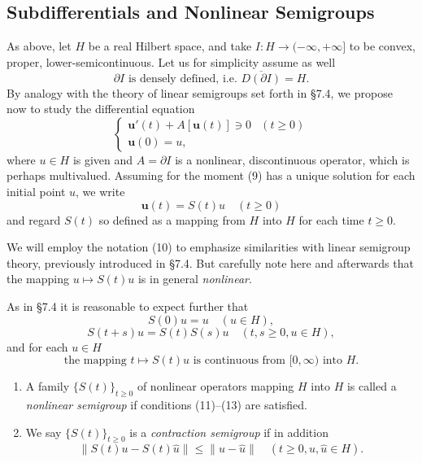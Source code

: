\subsection{Subdifferentials and Nonlinear Semigroups}
\label{sec:subdifferentials-nonlinear-semigroups}

As above, let $H$ be a real Hilbert space, and take $I : H \to (-\infty, +\infty]$ to be convex, proper, lower-semicontinuous. Let us for simplicity assume as well
\[
\partial I \text{ is densely defined, i.e. } \overline{D(\partial I)} = H.
\tag{8}
\]
By analogy with the theory of linear semigroups set forth in \S7.4, we propose now to study the differential equation
\[
\begin{cases} \mathbf{u}'(t) + A[\mathbf{u}(t)] \ni 0 & (t \ge 0) \\ \mathbf{u}(0) = u, \end{cases}
\tag{9}
\]
where $u \in H$ is given and $A = \partial I$ is a nonlinear, discontinuous operator, which is perhaps multivalued. Assuming for the moment (9) has a unique solution for each initial point $u$, we write
\[
\mathbf{u}(t) = S(t)u \quad (t \ge 0)
\tag{10}
\]
and regard $S(t)$ so defined as a mapping from $H$ into $H$ for each time $t \ge 0$.

\begin{remark}
\label{rem:nonlinear-semigroup-notation}
We will employ the notation (10) to emphasize similarities with linear semigroup theory, previously introduced in \S7.4. But carefully note here and afterwards that the mapping $u \mapsto S(t)u$ is in general \textit{nonlinear}.
\end{remark}

As in \S7.4 it is reasonable to expect further that
\[
S(0)u = u \quad (u \in H),
\tag{11}
\]
\[
S(t + s)u = S(t)S(s)u \quad (t, s \geq 0, u \in H),
\tag{12}
\]
and for each $u \in H$
\[
\text{the mapping } t \mapsto S(t)u \text{ is continuous from } [0, \infty) \text{ into } H.
\tag{13}
\]

\begin{definition}
\label{def:nonlinear-contraction-semigroup}
\begin{enumerate}
\item[(i)] A family $\{S(t)\}_{t \geq 0}$ of nonlinear operators mapping $H$ into $H$ is called a \textit{nonlinear semigroup} if conditions (11)--(13) are satisfied.
\item[(ii)] We say $\{S(t)\}_{t \geq 0}$ is a \textit{contraction semigroup} if in addition
\[
\|S(t)u - S(t)\hat{u}\| \leq \|u - \hat{u}\| \quad (t \geq 0, u, \hat{u} \in H).
\tag{14}
\]
\end{enumerate}
\end{definition}

